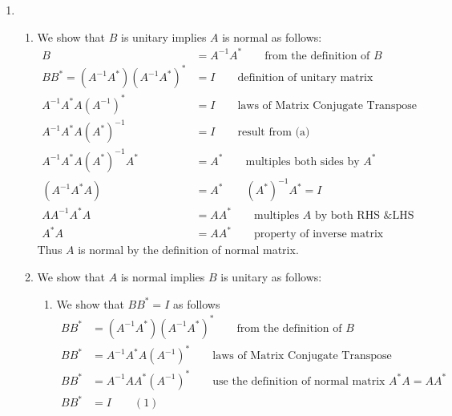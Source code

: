 \documentclass{uofa-eng-assignment}
\begin{document}
\begin{enumerate}
\begin{enumerate}
	      	\item
	      	      \begin{enumerate}
	      	      	\item We show that $B$ is unitary implies $A$ is normal as follows:                      
	      	      	      \begin{align*}
	      	      	      	B                                & = A^{-1}A^* \qquad \text{from the definition of } B   \\
	      	      	      	BB^* = (A^{-1}A^*) (A^{-1}A^*)^* & = I \qquad \text{definition of unitary matrix}        \\
	      	      	      	A^{-1}A^* A (A^{-1})^*           & = I \qquad \text{laws of Matrix Conjugate Transpose}  \\
	      	      	      	A^{-1}A^* A (A^{*})^{-1}         & = I \qquad \text{result from (a)}                     \\ 
                                        A^{-1}A^* A (A^{*})^{-1}A^*      & = A^* \qquad \text{multiples both sides by } A^*                     \\ 
	      	      	      	(A^{-1}A^* A)                    & = A^* \qquad (A^*)^{-1}A^* = I        \\
	      	      	      	AA^{-1}A^* A                     & = AA^* \qquad \text{multiples $A$ by both RHS \& LHS} \\
	      	      	      	A^*A                             & = AA^* \qquad \text{property of inverse matrix}       
	      	      	      \end{align*}
	      	      	      Thus $A$ is normal by the   definition of normal matrix.
	      	      	\item We show that $A$ is normal implies $B$ is unitary as follows:
                               \begin{enumerate}[(*)]
                                    \item We show that $BB^* = I$ as follows        
	      	      	      \begin{align*}
	      	      	      	BB^* & = (A^{-1}A^*)(A^{-1}A^*)^* \qquad \text{from the definition of $B$}     \\
	      	      	      	BB^* & = A^{-1}A^*A(A^{-1})^* \qquad \text{laws of Matrix Conjugate Transpose} \\
	      	      	      	BB^* & = A^{-1}AA^*(A^{-1})^* \qquad \text{use the definition of normal matrix } A^*A = AA^*             \\
	      	      	      	BB^* & = I \qquad (1)                                                          

\end{align*}
\end{enumerate}
\end{enumerate}
\end{enumerate}
\end{enumerate}
\end{document}
